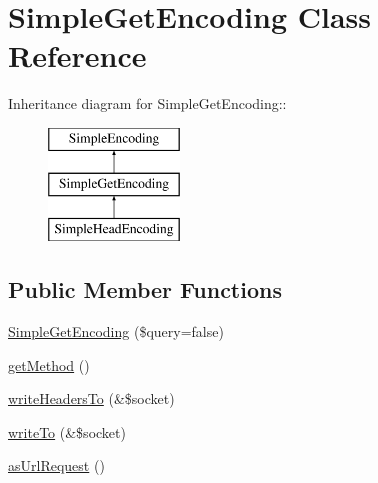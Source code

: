 \hypertarget{class_simple_get_encoding}{
\section{SimpleGetEncoding Class Reference}
\label{class_simple_get_encoding}
}
Inheritance diagram for SimpleGetEncoding::\begin{figure}[H]
\begin{center}
\leavevmode
\includegraphics[height=3cm]{class_simple_get_encoding}
\end{center}
\end{figure}
\subsection*{Public Member Functions}
\begin{DoxyCompactItemize}
\item 
\hyperlink{class_simple_get_encoding_a4f6014c0234211c8281c85e9f67c2a2e}{SimpleGetEncoding} (\$query=false)
\item 
\hyperlink{class_simple_get_encoding_ab8adaa71183f17a87edbcc7d27827861}{getMethod} ()
\item 
\hyperlink{class_simple_get_encoding_af4b6545b1d70c926b32530bc388cf73e}{writeHeadersTo} (\&\$socket)
\item 
\hyperlink{class_simple_get_encoding_a5d9365a3daabf8ec9cd6f33d3ed1c942}{writeTo} (\&\$socket)
\item 
\hyperlink{class_simple_get_encoding_a29db0a2343a6e8d7eea3371bcb64059c}{asUrlRequest} ()
\end{DoxyCompactItemize}


